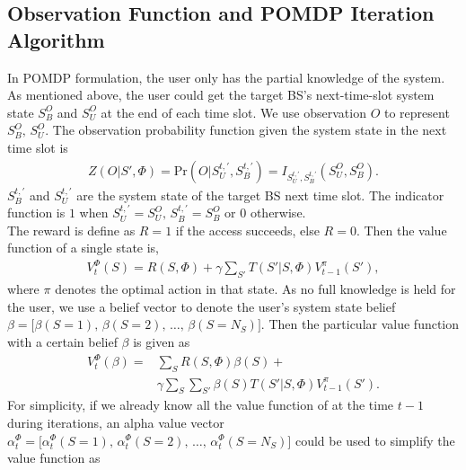 \documentclass[conference]{IEEEtran}
\begin{document}
\subsection{Observation Function and POMDP Iteration Algorithm}
In POMDP formulation, the user only has the partial knowledge of the system.
As mentioned above, the user could get the target BS's next-time-slot system state
\(S_B^O\) and \(S_U^O\) at the end of each time slot.
We use observation \(O\) to represent \(S_B^O,\,S_U^O\).
The observation probability function given the system state in the next time slot is
\begin{align}
	Z\left(O|S',\Phi\right) = \mbox{Pr}\left(O\Big|S_U^{t,'}, S_B^{t,'}\right) =
	I_{S_U^{t,'},S_B^{t,'}}\left(S_U^O, S_B^O\right).
\end{align}
\(S_B^{t,'}\) and \(S_U^{t,'}\) are the system state of the target BS next time slot.
The indicator function is \(1\) when \(S_U^{t,'} = S_U^O,\,S_B^{t,'}=S_B^O\) or \(0\) otherwise.\\\indent
The reward is define as \(R = 1\) if the access succeeds, else \(R= 0\).
Then the value function of a single state is,
\begin{equation}
\begin{aligned}
	V_t^\Phi\left(S\right) = R\left(S,\Phi\right) +\gamma\sum\limits_{S'}T\left(S'|S,\Phi\right)V_{t-1}^\pi\left(S'\right),
\end{aligned}
\end{equation}
where \(\pi\) denotes the optimal action in that state.
As no full knowledge is held for the user, we use a belief vector to denote the user's system state belief
\(\beta = \lbrack \beta\left(S = 1\right),\,\beta\left(S = 2\right),\,\ldots,\,\beta\left(S = N_S\right)\rbrack\).	
Then the particular value function with a certain belief \(\beta\) is given as
\begin{equation}
\begin{aligned}
	V_t^\Phi\left(\beta\right) = & \sum\limits_{S}R\left(S,\Phi\right)\beta\left(S\right) +\\
	&	\gamma\sum\limits_{S}\sum\limits_{S'}\beta\left(S\right)T\left(S'|S,\Phi\right)V_{t-1}^\pi\left(S'\right).
\end{aligned}
\end{equation}
For simplicity, if we already know all the value function of at the time \(t-1\) during iterations,
an alpha value vector \(\alpha_t^\Phi = \lbrack \alpha_t^\Phi\left(S = 1\right),\,
\alpha_t^\Phi\left(S = 2\right),\,\ldots,\,\alpha_t^\Phi\left(S = N_S\right)\rbrack\)
could be used to simplify the value function as
\end{document}
